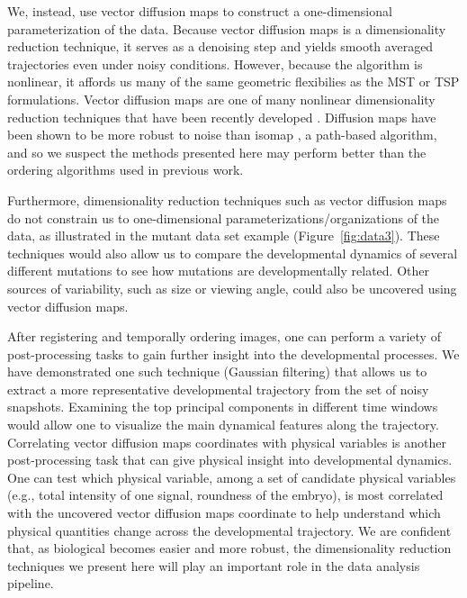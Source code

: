 \documentclass{pnastwo}
\begin{document}
\begin{article}
We, instead, use vector diffusion maps to construct a one-dimensional parameterization of the data.
%
Because vector diffusion maps is a dimensionality reduction technique, it serves as a denoising step and yields smooth averaged trajectories even under noisy conditions.
%
However, because the algorithm is nonlinear, it affords us many of the same geometric flexibilies as the MST or TSP formulations.
%
Vector diffusion maps are one of many nonlinear dimensionality reduction techniques that have been recently developed \cite{Belkin2003, tenenbaum2000global, Donoho2003, Roweis2000}.
%
Diffusion maps have been shown to be more robust to noise than isomap \cite{balasubramanian2002isomap}, a path-based algorithm, and so we suspect the methods presented here may perform better than the ordering algorithms used in previous work.

Furthermore, dimensionality reduction techniques such as vector diffusion maps do not constrain us to one-dimensional parameterizations/organizations of the data, as illustrated in the mutant data set example (Figure~\ref{fig:data3}).
%
These techniques would also allow us to compare the developmental dynamics of several different mutations to see how mutations are developmentally related.
%
Other sources of variability, such as size or viewing angle, could also be uncovered using vector diffusion maps.

After registering and temporally ordering images, one can perform a variety of post-processing tasks to gain further insight into the developmental processes.
%
We have demonstrated one such technique (Gaussian filtering) that allows us to extract a more representative developmental trajectory from the set of noisy snapshots.
%
Examining the top principal components in different time windows would allow one to visualize the main dynamical features along the trajectory.
%
%
Correlating vector diffusion maps coordinates with physical variables is another post-processing task that can give physical insight into developmental dynamics.
%
One can test which physical variable, among a set of candidate physical variables (e.g., total intensity of one signal, roundness of the embryo), is most correlated with the uncovered vector diffusion maps coordinate to help understand which physical quantities change across the developmental trajectory.
%
We are confident that, as biological becomes easier and more robust, the dimensionality reduction techniques we present here will play an important role in the data analysis pipeline.



\end{article}
\end{document}
